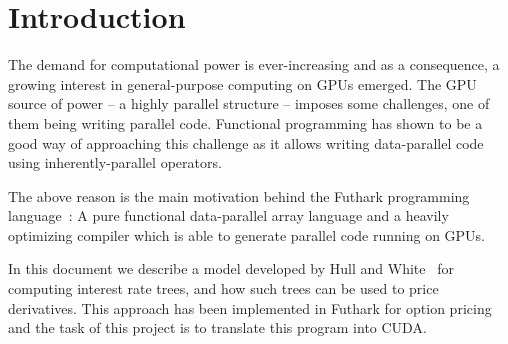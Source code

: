 \section{Introduction}

The demand for computational power is ever-increasing and as
a consequence, a growing interest in general-purpose
computing on GPUs emerged. The GPU source of power -- a
highly parallel structure -- imposes some challenges, one of
them being writing parallel code. Functional programming has
shown to be a good way of approaching this challenge as it
allows writing data-parallel code using inherently-parallel
operators.

The above reason is the main motivation behind the Futhark
programming language~\cite{futharkweb}: A pure functional
data-parallel array language and a heavily optimizing
compiler which is able to generate parallel code running on
GPUs.

In this document we describe a model developed by Hull and
White~\cite{HullWhite94} for computing interest rate trees,
and how such trees can be used to price derivatives. This
approach has been implemented in Futhark for option pricing
and the task of this project is to translate this program
into CUDA.
